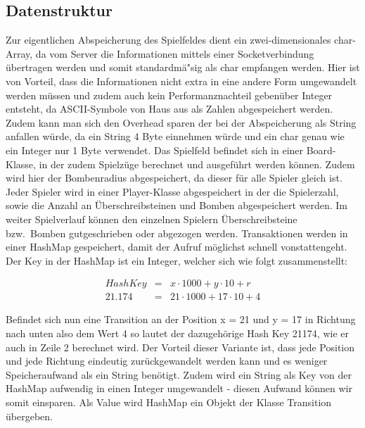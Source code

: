 \subsection{Datenstruktur}\label{subsec:datenstruktur}
Zur eigentlichen Abspeicherung des Spielfeldes dient ein zwei-dimensionales char-Array, da vom Server die Informationen mittels einer Socketverbindung \"ubertragen werden und somit standardm\"a"sig als char empfangen werden.
Hier ist von Vorteil, dass die Informationen nicht extra in eine andere Form umgewandelt werden m\"ussen und zudem auch kein Performanznachteil geben\"uber Integer entsteht, da ASCII-Symbole von Haus aus als Zahlen abgespeichert werden.
Zudem kann man sich den Overhead sparen der bei der Abspeicherung als String anfallen w\"urde, da ein String 4 Byte einnehmen w\"urde und ein char genau wie ein Integer nur 1 Byte verwendet.
Das Spielfeld befindet sich in einer Board-Klasse, in der zudem Spielz\"uge berechnet und ausgef\"uhrt werden k\"onnen.
Zudem wird hier der Bombenradius abgespeichert, da dieser f\"ur alle Spieler gleich ist.
Jeder Spieler wird in einer Player-Klasse abgespeichert in der die Spielerzahl, sowie die Anzahl an \"Uberschreibsteinen und Bomben abgespeichert werden.
Im weiter Spielverlauf k\"onnen den einzelnen Spielern \"Uberschreibsteine bzw.\ Bomben gutgeschrieben oder abgezogen werden.
Transaktionen werden in einer HashMap gespeichert, damit der Aufruf m\"oglichst schnell vonstattengeht.
Der Key in der HashMap ist ein Integer, welcher sich wie folgt zusammenstellt:

\begin{align}
    HashKey &=& x \cdot 1000 + y \cdot 10 + r \\
    21.174 &=& 21 \cdot 1000 + 17 \cdot 10 + 4
\end{align}

Befindet sich nun eine Transition an der Position x = 21 und y = 17 in Richtung nach unten also dem Wert 4 so lautet der dazugeh\"orige Hash Key 21174, wie er auch in Zeile 2 berechnet wird.
Der Vorteil dieser Variante ist, dass jede Position und jede Richtung eindeutig zur\"uckgewandelt werden kann und es weniger Speicheraufwand als ein String ben\"otigt.
Zudem wird ein String als Key von der HashMap aufwendig in einen Integer umgewandelt - diesen Aufwand k\"onnen wir somit einsparen.
Als Value wird HashMap ein Objekt der Klasse Transition \"ubergeben.

